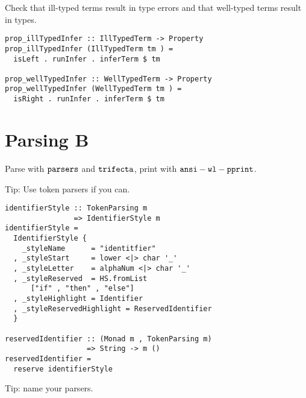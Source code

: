 \documentclass{beamer}
\begin{document}
\begin{frame}[fragile]
  \begin{center}
   Check that ill-typed terms result in type errors and that well-typed terms
   result in types.
  \end{center}
  \begin{verbatim}
prop_illTypedInfer :: IllTypedTerm -> Property
prop_illTypedInfer (IllTypedTerm tm ) =
  isLeft . runInfer . inferTerm $ tm

prop_wellTypedInfer :: WellTypedTerm -> Property
prop_wellTypedInfer (WellTypedTerm tm ) =
  isRight . runInfer . inferTerm $ tm
  \end{verbatim}
\end{frame} 

\section{Parsing B}

\begin{frame}[c]
  \begin{center}
Parse with $\tt{parsers}$ and $\tt{trifecta}$, print with $\tt{ansi-wl-pprint}$.
  \end{center}
\end{frame}

\begin{frame}[c]
  \begin{center}
Tip: Use token parsers if you can.
  \end{center}
\end{frame}

\begin{frame}[fragile]
  \begin{verbatim}
identifierStyle :: TokenParsing m
                => IdentifierStyle m
identifierStyle =
  IdentifierStyle {
    _styleName      = "identitfier"
  , _styleStart     = lower <|> char '_'
  , _styleLetter    = alphaNum <|> char '_'
  , _styleReserved  = HS.fromList 
      ["if" , "then" , "else"]
  , _styleHighlight = Identifier
  , _styleReservedHighlight = ReservedIdentifier
  }

reservedIdentifier :: (Monad m , TokenParsing m)
                   => String -> m ()
reservedIdentifier =
  reserve identifierStyle
  \end{verbatim}
\end{frame} 

\begin{frame}[c]
  \begin{center}
Tip: name your parsers.
  \end{center}
\end{frame}
\end{document}

